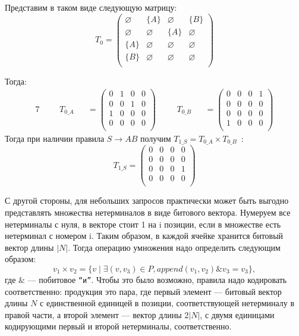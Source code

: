 \begin{example}
Представим в таком виде следующую матрицу:
\[
T_0 = \begin{pmatrix}
\varnothing & \{A\}       & \varnothing & \{B\}       \\
\varnothing & \varnothing & \{A\}       & \varnothing \\
\{A\}       & \varnothing & \varnothing & \varnothing \\
\{B\}       & \varnothing & \varnothing & \varnothing \\
\end{pmatrix}
\]

Тогда:
\begin{alignat*}{7}
& &&T_{0\_A} &&= \begin{pmatrix}
0 & 1       & 0 & 0       \\
0 & 0 & 1       & 0 \\
1  & 0 & 0 & 0       \\
0       & 0 & 0 & 0 \\
\end{pmatrix} \ \ \ \ &&T_{0\_B} &&= \begin{pmatrix}
0 & 0       & 0 & 1       \\
0       & 0 & 0       & 0 \\
0  & 0 & 0 & 0       \\
1       & 0 & 0 & 0 \\
\end{pmatrix}
\end{alignat*}
Тогда при наличии правила $S \to A B$ получим $T_{1\_S} =T_{0\_A} \times T_{0\_B}$~:
\[
T_{1\_S} = \begin{pmatrix}
0 & 0       & 0 & 0       \\
0       & 0 & 0       & 0 \\
0  & 0 & 0 & 1       \\
0       & 0 & 0 & 0 \\
\end{pmatrix}
\]
\end{example}

\medskip

С другой стороны, для небольших запросов практически может быть выгодно представлять множества нетерминалов в виде битового вектора.
Нумеруем все нетерминалы с нуля, в векторе стоит 1 на i позиции, если в множестве есть нетерминал с номером i.
Таким образом, в каждой ячейке хранится битовый вектор длины $|N|$.
Тогда операцию умножения надо определить следующим образом:
$$v_1 \times v_2 = \{v \mid \exists (v,v_3) \in P, \textit{append}(v_1, v_2) \& v_3 = v_3\},$$ где $\&$ --- побитовое \texttt{``и''}.
Чтобы это было возможно, правила надо кодировать соответственно: продукция это пара, где первый элемент --- битовый вектор длины $N$ с единственной единицей в позиции, соответствующей нетерминалу в правой части, а второй элемент --- вектор длины $2|N|$, с двумя единицами кодирующими первый и второй нетерминалы, соответственно.

